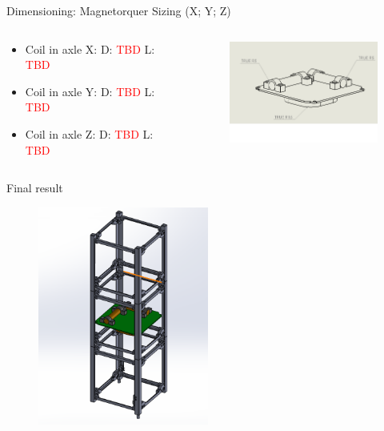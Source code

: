 \documentclass{beamer}
\begin{document}
\begin{frame}{Dimensioning: Magnetorquer Sizing (X; Y; Z)}
    
     \begin{columns}[t]
        \begin{column}[t]{0.5\textwidth}
            \begin{itemize}
                \item Coil in axle X:
                D: \textcolor{red}{TBD}
                L: \textcolor{red}{TBD}
                \item Coil in axle Y:
                D: \textcolor{red}{TBD}
                L: \textcolor{red}{TBD}
                \item Coil in axle Z:
                D: \textcolor{red}{TBD}
                L: \textcolor{red}{TBD}

            \end{itemize}
        \end{column}
        \begin{column}[t]{0.5\textwidth}
            \begin{figure}[!ht]
                \begin{center}
                    \includegraphics[width=5cm]{figures/desenho adcs.png}
                \end{center}
            \end{figure}
        \end{column}
    \end{columns}

\end{frame}

\begin{frame}{Final result}
\begin{figure}[!ht]
        \begin{center}
            \includegraphics[width=5.6cm]{figures/Structure with ADCS.png}
        \end{center}
    \end{figure}

\end{frame}
\end{document}

